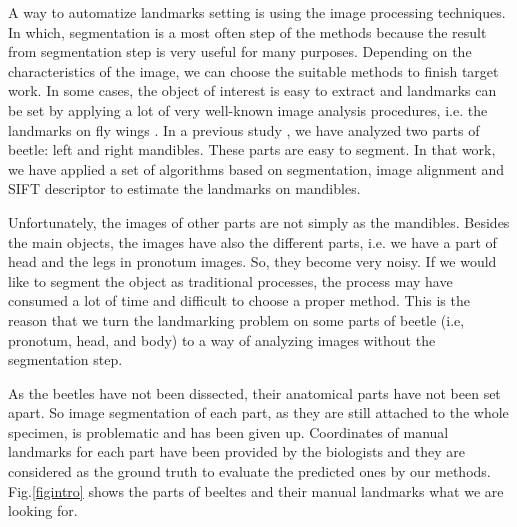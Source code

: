 \documentclass[12pt,a4paper]{article}
\begin{document}
A way to automatize landmarks setting is using the image processing techniques. In which, segmentation is a most often step of the methods because the result from segmentation step is very useful for many purposes. Depending on the characteristics of the image, we can choose the suitable methods to finish target work. In some cases, the object of interest is easy to extract and landmarks can be set by applying a lot of very well-known image analysis procedures, i.e. the landmarks on fly wings \cite{palaniswamy2010automatic}. In a previous study \cite{le2017maelab}, we have analyzed two parts of beetle: left and right mandibles. These parts are easy to segment. In that work, we have applied a set of algorithms based on segmentation, image alignment and SIFT \cite{lowe2004distinctive} descriptor to estimate the landmarks on mandibles. 

Unfortunately, the images of other parts are not simply as the mandibles. Besides the main objects, the images have also the different parts, i.e. we have a part of head and the legs in pronotum images. So, they become very noisy. If we would like to segment the object as traditional processes, the process may have consumed a lot of time and difficult to choose a proper method. This is the reason that we turn the landmarking problem on some parts of beetle (i.e, pronotum, head, and body) to a way of analyzing images without the segmentation step. 

As the beetles have not been dissected, their anatomical parts have not been set apart. So image segmentation of each part, as they are still attached to the whole specimen, is problematic and has been given up. Coordinates of manual landmarks for each part have been provided by the biologists and they are considered as the ground truth to evaluate the predicted ones by our methods. Fig.\ref{figintro} shows the parts of beeltes and their manual landmarks what we are looking for. 
\end{document}

